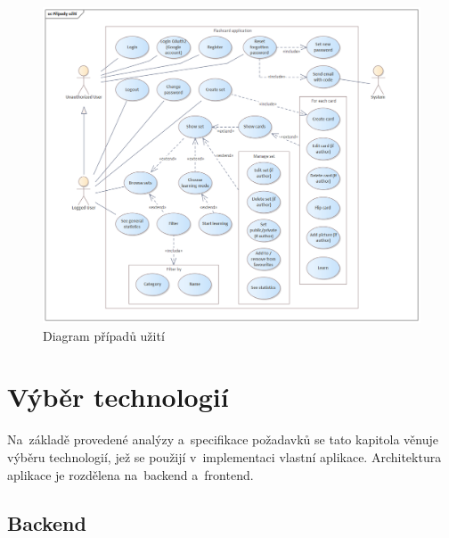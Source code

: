 \documentclass[twoside]{ctuthesis}
\begin{document}
\begin{figure}[H]
\centering
\includegraphics[width=1.32\textwidth, height=0.88\textheight]{Případy užití.png}
\caption{Diagram případů užití}
\label{fig:uc}
\end{figure}
%
%
%

\chapter{Výběr technologií}
\label{chap:four}

Na~základě provedené analýzy a~specifikace požadavků se tato kapitola věnuje výběru technologií, jež se použijí v~implementaci vlastní aplikace. Architektura aplikace je rozdělena na~backend a~frontend. 
%

\section{Backend}
\end{document}
